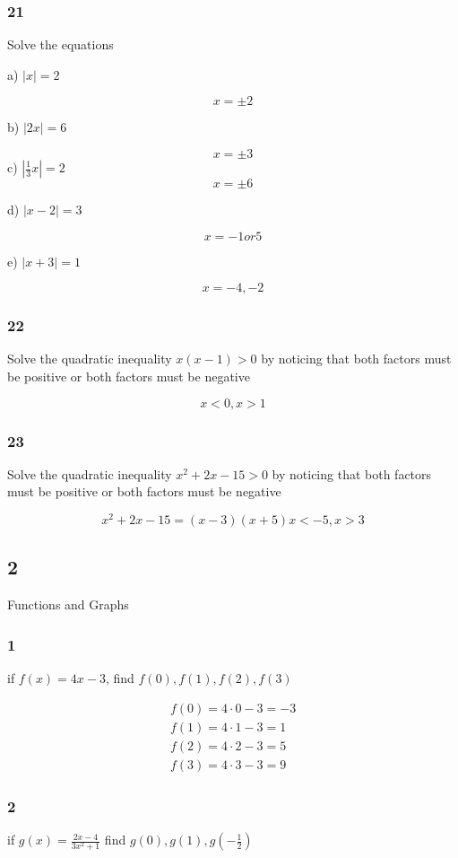\documentclass[]{report}
\begin{document}
\subsubsection{21}

Solve the equations

a) $|x| = 2 $

\[
x = \pm 2
\]

b) $|2x| = 6$

\[
x = \pm 3
\]
c) $|\frac{1}{3}x| = 2 $
\[
x = \pm 6
\]

d) $|x-2| = 3 $

\[
x = -1 or 5
\]

e) $|x + 3 | = 1$

\[
x = -4, -2
\]

\subsubsection{22}

Solve the quadratic inequality $x(x-1) > 0$ by noticing that both factors must be positive or both factors must be negative

\[
x < 0 , x > 1
\]

\subsubsection{23}
Solve the quadratic inequality $x^2 + 2x - 15 > 0$ by noticing that both factors must be positive or both factors must be negative

\[
x^2 + 2x - 15  = (x - 3)(x + 5)
x < -5, x > 3
\]

\subsection{2} Functions and Graphs

\subsubsection{1}
if $f(x) = 4x-3$, find $f(0), f(1), f(2), f(3)$

\begin{align*}
f(0) = 4\cdot0 - 3 = -3\\
f(1) = 4\cdot1 - 3 = 1 \\
f(2) = 4\cdot2 - 3 = 5 \\
f(3) = 4\cdot3 - 3 = 9
\end{align*}

\subsubsection{2}
if $g(x) = \frac{2x-4}{3x^2 + 1}$ find $g(0), g(1), g(-\frac{1}{2})$
\end{document}
